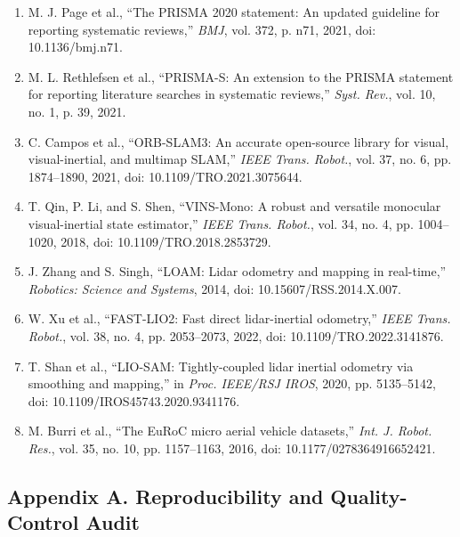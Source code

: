 \documentclass[
  journal]{IEEEtran}
\providecommand{\tightlist}{%
  \setlength{\itemsep}{0pt}\setlength{\parskip}{0pt}}
\begin{document}
\begin{enumerate}
\def\labelenumi{\arabic{enumi}.}
\tightlist
\item
  M. J. Page et al., ``The PRISMA 2020 statement: An updated guideline
  for reporting systematic reviews,'' \emph{BMJ}, vol. 372, p. n71,
  2021, doi: 10.1136/bmj.n71.
\item
  M. L. Rethlefsen et al., ``PRISMA-S: An extension to the PRISMA
  statement for reporting literature searches in systematic reviews,''
  \emph{Syst. Rev.}, vol. 10, no. 1, p. 39, 2021.
\item
  C. Campos et al., ``ORB-SLAM3: An accurate open-source library for
  visual, visual-inertial, and multimap SLAM,'' \emph{IEEE Trans.
  Robot.}, vol. 37, no. 6, pp. 1874--1890, 2021, doi:
  10.1109/TRO.2021.3075644.
\item
  T. Qin, P. Li, and S. Shen, ``VINS-Mono: A robust and versatile
  monocular visual-inertial state estimator,'' \emph{IEEE Trans.
  Robot.}, vol. 34, no. 4, pp. 1004--1020, 2018, doi:
  10.1109/TRO.2018.2853729.
\item
  J. Zhang and S. Singh, ``LOAM: Lidar odometry and mapping in
  real-time,'' \emph{Robotics: Science and Systems}, 2014, doi:
  10.15607/RSS.2014.X.007.
\item
  W. Xu et al., ``FAST-LIO2: Fast direct lidar-inertial odometry,''
  \emph{IEEE Trans. Robot.}, vol. 38, no. 4, pp. 2053--2073, 2022, doi:
  10.1109/TRO.2022.3141876.
\item
  T. Shan et al., ``LIO-SAM: Tightly-coupled lidar inertial odometry via
  smoothing and mapping,'' in \emph{Proc. IEEE/RSJ IROS}, 2020, pp.
  5135--5142, doi: 10.1109/IROS45743.2020.9341176.
\item
  M. Burri et al., ``The EuRoC micro aerial vehicle datasets,''
  \emph{Int. J. Robot. Res.}, vol. 35, no. 10, pp. 1157--1163, 2016,
  doi: 10.1177/0278364916652421.
\end{enumerate}

\subsection{Appendix A. Reproducibility and Quality-Control
Audit}\label{appendix-a-reproducibility-and-quality-control-audit}
\end{document}
